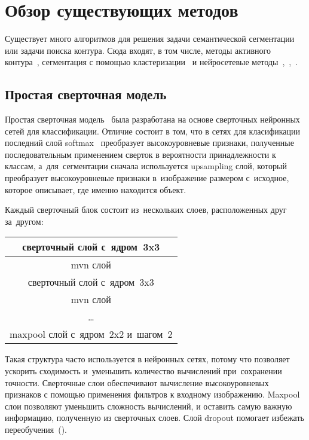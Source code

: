 \section{Обзор существующих методов}

Существует много алгоритмов для решения задачи семантической сегментации или задачи поиска контура. Сюда входят, в том числе, методы активного контура~\cite{snakes}, сегментация с помощью кластеризации~\cite{clustering_segm} и нейросетевые методы~\cite{fcn},~\cite{unet},~\cite{gridnet}.

\subsection{Простая сверточная модель}

Простая сверточная модель~\cite{fcn_1_layer_upsample} была разработана на основе сверточных нейронных сетей для классификации. Отличие состоит в том, что в сетях для класификации последний слой softmax~\cite{classification_loss} преобразует высокоуровневые признаки, полученные последовательным применением сверток в вероятности принадлежности к классам, а~для~сегментации сначала используется upsampling слой, который преобразует высокоуровневые признаки в~изображение размером с~исходное, которое описывает, где именно находится объект. 

Каждый сверточный блок состоит из~нескольких слоев, расположенных друг за~другом:

\begin{center}
  \begin{tabular}{ c }
    \hline
    сверточный слой с~ядром~3x3           \\ \hline
    mvn слой                              \\ \hline
    сверточный слой с~ядром~3x3           \\ \hline
    mvn слой                              \\ \hline
    \dots                                 \\ \hline
    maxpool слой с~ядром~2x2 и~шагом~2    \\ 
    \hline
  \end{tabular}
\end{center}

Такая структура часто используется в нейронных сетях, потому что позволяет ускорить сходимость и~уменьшить количество вычислений при~сохранении точности. Сверточные слои обеспечивают вычисление высокоуровневых признаков с помощью применения фильтров к входному изображению. Maxpool слои позволяют уменьшить сложность вычислений, и оставить самую важную информацию, полученную из сверточных слоев. Слой dropout помогает избежать переобучения~(\cite{dropout}). 

